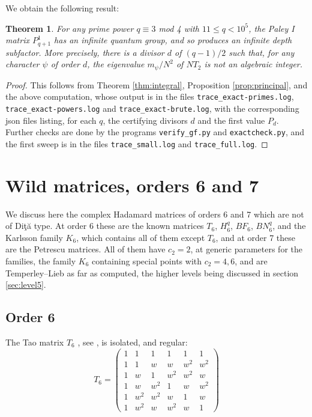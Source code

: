\documentclass[11pt]{amsart}
\newtheorem{theorem}{Theorem}[section]
\begin{document}
\medskip

\noindent We obtain the following result:

\begin{theorem}\label{thm:paley}
For any prime power $q\equiv3$ mod 4 with $11\leq q<10^5$, the Paley I matrix $P^1_{q+1}$ has an infinite quantum group, and so produces an infinite depth subfactor. More precisely, there is a divisor $d$ of $(q-1)/2$ such that, for any character $\psi$ of order $d$, the eigenvalue $m_\psi/N^2$ of $NT_2$ is not an algebraic integer.
\end{theorem}

\begin{proof}
This follows from Theorem \ref{thm:integral}, Proposition \ref{prop:principal}, and the above computation, whose output is in the files \texttt{trace\_exact-primes.log}, \texttt{trace\_exact-powers.log} and \texttt{trace\_exact-brute.log}, with the corresponding json files listing, for each $q$, the certifying divisors $d$ and the first value $P_d$. Further checks are done by the programs \texttt{verify\_gf.py} and \texttt{exactcheck.py}, and the first sweep is in the files \texttt{trace\_small.log} and \texttt{trace\_full.log}.
\end{proof}

\section{Wild matrices, orders 6 and 7}\label{sec:wild}

We discuss here the complex Hadamard matrices of orders 6 and 7 which are not of Di\c t\u a type. At order 6 these are the known matrices $T_6$, $H_6^q$, $BF_6$, $BN_6^q$, and the Karlsson family $K_6$, which contains all of them except $T_6$, and at order 7 these are the Petrescu matrices. All of them have $c_2=2$, at generic parameters for the families, the family $K_6$ containing special points with $c_2=4,6$, and are Temperley--Lieb as far as computed, the higher levels being discussed in section \ref{sec:level5}.

\subsection{Order 6}

The Tao matrix $T_6$ \cite{tao}, see \cite[Proposition 6.16]{banicaHM}, is isolated, and regular:
$$T_6=\begin{pmatrix}
1&1&1&1&1&1\\
1&1&w&w&w^2&w^2\\
1&w&1&w^2&w^2&w\\
1&w&w^2&1&w&w^2\\
1&w^2&w^2&w&1&w\\
1&w^2&w&w^2&w&1
\end{pmatrix}$$
\end{document}
